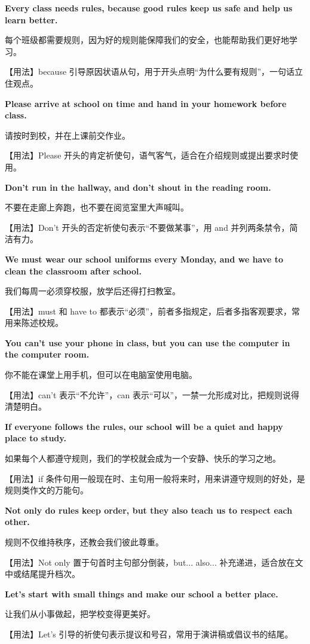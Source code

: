 \documentclass[UTF8,a4paper,11pt,oneside]{ctexbook}
\newcommand{\fansection}[1]{%
  \par\addvspace{2.4ex}%
  \Needspace{6\baselineskip}%
  \noindent{\sffamily\Large\bfseries\color{mainblue}#1}\par
  \nopagebreak
  \addvspace{0.2ex}%
  \noindent{\color{rulelight}\rule{\linewidth}{0.9pt}}\par
  \addvspace{0.9ex}%
  \nobreak
}
\newcommand{\fanpat}[3]{%
  \item{\bfseries #1}\par\nopagebreak
  {\small\color{textgray}#2}\par\nopagebreak
  {\footnotesize\color{accent!90!black}【用法】#3}\par
}
\begin{document}
\fansection{〇、本单元写作常用句型}
\begin{fanpatterns}
\fanpat{Every class needs rules, because good rules keep us safe and help us learn better.}{每个班级都需要规则，因为好的规则能保障我们的安全，也能帮助我们更好地学习。}{because 引导原因状语从句，用于开头点明“为什么要有规则”，一句话立住观点。}

\fanpat{Please arrive at school on time and hand in your homework before class.}{请按时到校，并在上课前交作业。}{Please 开头的肯定祈使句，语气客气，适合在介绍规则或提出要求时使用。}

\fanpat{Don't run in the hallway, and don't shout in the reading room.}{不要在走廊上奔跑，也不要在阅览室里大声喊叫。}{Don't 开头的否定祈使句表示“不要做某事”，用 and 并列两条禁令，简洁有力。}

\fanpat{We must wear our school uniforms every Monday, and we have to clean the classroom after school.}{我们每周一必须穿校服，放学后还得打扫教室。}{must 和 have to 都表示“必须”，前者多指规定，后者多指客观要求，常用来陈述校规。}

\fanpat{You can't use your phone in class, but you can use the computer in the computer room.}{你不能在课堂上用手机，但可以在电脑室使用电脑。}{can't 表示“不允许”，can 表示“可以”，一禁一允形成对比，把规则说得清楚明白。}

\fanpat{If everyone follows the rules, our school will be a quiet and happy place to study.}{如果每个人都遵守规则，我们的学校就会成为一个安静、快乐的学习之地。}{if 条件句用一般现在时、主句用一般将来时，用来讲遵守规则的好处，是规则类作文的万能句。}

\fanpat{Not only do rules keep order, but they also teach us to respect each other.}{规则不仅维持秩序，还教会我们彼此尊重。}{Not only 置于句首时主句部分倒装，but... also... 补充递进，适合放在文中或结尾提升档次。}

\fanpat{Let's start with small things and make our school a better place.}{让我们从小事做起，把学校变得更美好。}{Let's 引导的祈使句表示提议和号召，常用于演讲稿或倡议书的结尾。}

\end{fanpatterns}

\fansection{一、满分范文}
\end{document}
